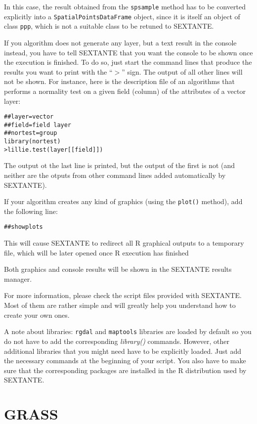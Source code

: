 In this case, the result obtained from the \texttt{spsample} method has to be converted explicitly into a \texttt{SpatialPointsDataFrame} object, since it is itself an object of class \texttt{ppp}, which is not a suitable class to be retuned to SEXTANTE.

If you algorithm does not generate any layer, but a text result in the console instead, you have to tell SEXTANTE that you want the console to be shown once the execution is finished. To do so, just start the command lines that produce the results you want to print with the ``$>$'' sign. The output of all other lines will not be shown. For instance, here is the description file of an algorithms that performs a normality test on a given field (column) of the attributes of a vector layer:

\begin{verbatim}
##layer=vector
##field=field layer
##nortest=group
library(nortest)
>lillie.test(layer[[field]]) 	
\end{verbatim}

The output ot the last line is printed, but the output of the first is not (and neither are the otputs from other command lines added automatically by SEXTANTE).

If your algorithm creates any kind of graphics (using the \texttt{plot()} method), add the following line:

\begin{verbatim}
##showplots
\end{verbatim}

This will cause SEXTANTE to redirect all R graphical outputs to a temporary file, which will be later opened once R execution has finished

Both graphics and console results will be shown in the SEXTANTE results manager.

For more information, please check the script files provided with SEXTANTE. Most of them are rather simple and will greatly help you understand how to create your own ones.

A note about libraries: \texttt{rgdal} and \texttt{maptools} libraries are loaded by default so you do not have to add the corresponding \emph{library()} commands. However, other additional libraries that you might need have to be explicitly loaded. Just add the necessary commands at the beginning of your script. You also have to make sure that the corresponding packages are installed in the R distribution used by SEXTANTE.

\section{GRASS}


